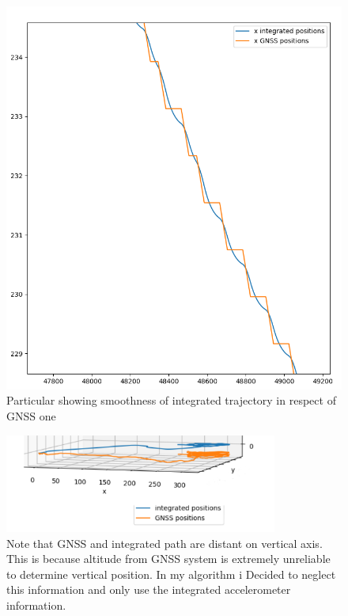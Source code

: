 \begin{figure}[H]
\centering
\includegraphics[width=\textwidth/2]{smooth.png}
\caption{Particular showing smoothness of integrated trajectory in respect of GNSS one}
\end{figure}

\begin{figure}[H]
\centering
\includegraphics[width=0.8\textwidth]{parking_3d_z_different.png}
\caption{Note that GNSS and integrated path are distant on vertical axis. This is because altitude from GNSS system is extremely unreliable to determine vertical position. In my algorithm i Decided to neglect this information and only use the integrated accelerometer information.}
\end{figure}


